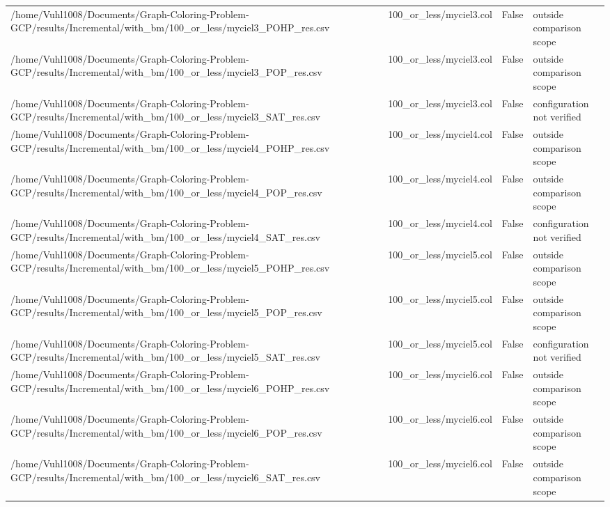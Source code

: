 \begin{table}[htbp]
\begin{tabular}{llll}
/home/Vuhl1008/Documents/Graph-Coloring-Problem-GCP/results/Incremental/with\_bm/100\_or\_less/myciel3\_POHP\_res.csv & 100\_or\_less/myciel3.col & False & outside comparison scope \\
/home/Vuhl1008/Documents/Graph-Coloring-Problem-GCP/results/Incremental/with\_bm/100\_or\_less/myciel3\_POP\_res.csv & 100\_or\_less/myciel3.col & False & outside comparison scope \\
/home/Vuhl1008/Documents/Graph-Coloring-Problem-GCP/results/Incremental/with\_bm/100\_or\_less/myciel3\_SAT\_res.csv & 100\_or\_less/myciel3.col & False & configuration not verified \\
/home/Vuhl1008/Documents/Graph-Coloring-Problem-GCP/results/Incremental/with\_bm/100\_or\_less/myciel4\_POHP\_res.csv & 100\_or\_less/myciel4.col & False & outside comparison scope \\
/home/Vuhl1008/Documents/Graph-Coloring-Problem-GCP/results/Incremental/with\_bm/100\_or\_less/myciel4\_POP\_res.csv & 100\_or\_less/myciel4.col & False & outside comparison scope \\
/home/Vuhl1008/Documents/Graph-Coloring-Problem-GCP/results/Incremental/with\_bm/100\_or\_less/myciel4\_SAT\_res.csv & 100\_or\_less/myciel4.col & False & configuration not verified \\
/home/Vuhl1008/Documents/Graph-Coloring-Problem-GCP/results/Incremental/with\_bm/100\_or\_less/myciel5\_POHP\_res.csv & 100\_or\_less/myciel5.col & False & outside comparison scope \\
/home/Vuhl1008/Documents/Graph-Coloring-Problem-GCP/results/Incremental/with\_bm/100\_or\_less/myciel5\_POP\_res.csv & 100\_or\_less/myciel5.col & False & outside comparison scope \\
/home/Vuhl1008/Documents/Graph-Coloring-Problem-GCP/results/Incremental/with\_bm/100\_or\_less/myciel5\_SAT\_res.csv & 100\_or\_less/myciel5.col & False & configuration not verified \\
/home/Vuhl1008/Documents/Graph-Coloring-Problem-GCP/results/Incremental/with\_bm/100\_or\_less/myciel6\_POHP\_res.csv & 100\_or\_less/myciel6.col & False & outside comparison scope \\
/home/Vuhl1008/Documents/Graph-Coloring-Problem-GCP/results/Incremental/with\_bm/100\_or\_less/myciel6\_POP\_res.csv & 100\_or\_less/myciel6.col & False & outside comparison scope \\
/home/Vuhl1008/Documents/Graph-Coloring-Problem-GCP/results/Incremental/with\_bm/100\_or\_less/myciel6\_SAT\_res.csv & 100\_or\_less/myciel6.col & False & outside comparison scope \\

\end{tabular}
\end{table}
